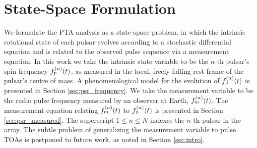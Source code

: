 \documentclass[fleqn,usenatbib,useAMS]{mnras}
\begin{document}
\section{State-Space Formulation}\label{sec:model}
We formulate the PTA analysis as a state-space problem, in which the intrinsic rotational state of each pulsar evolves according to a stochastic differential equation and is related to the observed pulse sequence via a measurement equation. In this work we take the intrinsic state variable to be the $n$-th pulsar's spin frequency $f_{\rm p}^{(n)}(t)$, as measured in the local, freely-falling rest frame of the pulsar's centre of mass. A phenomenological model for the evolution of $f_{\rm p}^{(n)}(t)$ is presented in Section \ref{sec:psr_frequency}.  We take the measurement variable to be the radio pulse frequency measured by an observer at Earth, $f_{\rm m}^{(n)}(t)$.  The measurement equation relating $f_{\rm m}^{(n)}(t)$ to $f_{\rm p}^{(n)}(t)$ is presented in Section \ref{sec:psr_measured}. The superscript $1\leq n\leq N$ indexes the $n$-th pulsar in the array. The subtle problem of generalizing the measurement variable to pulse TOAs is postponed to future work, as noted in Section \ref{sec:intro}.
\end{document}
